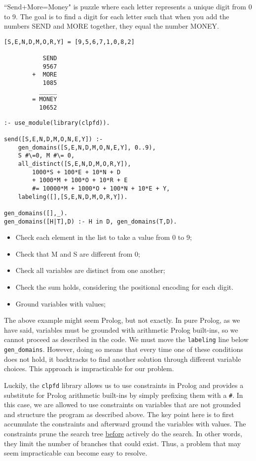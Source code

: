 \documentclass{article}
\begin{document}
\begin{example}
    ``Send+More=Money" is puzzle where each letter represents a unique digit
    from 0 to 9. The goal is to find a digit for each letter such that when
    you add the numbers SEND and MORE together, they equal the number MONEY.
{\small
    \begin{verbatim}
[S,E,N,D,M,O,R,Y] = [9,5,6,7,1,0,8,2]

           SEND
           9567
        +  MORE
           1085 
          _____
        = MONEY
          10652
    \end{verbatim}
    \begin{verbatim}
:- use_module(library(clpfd)).

send([S,E,N,D,M,O,N,E,Y]) :-
    gen_domains([S,E,N,D,M,O,N,E,Y], 0..9),
    S #\=0, M #\= 0,
    all_distinct([S,E,N,D,M,O,R,Y]),
        1000*S + 100*E + 10*N + D 
        + 1000*M + 100*O + 10*R + E
        #= 10000*M + 1000*O + 100*N + 10*E + Y,
    labeling([],[S,E,N,D,M,O,R,Y]).

gen_domains([],_).
gen_domains([H|T],D) :- H in D, gen_domains(T,D).
    \end{verbatim}
}
    \begin{itemize}
        \item Check each element in the list to take
            a value from 0 to 9;
        \item Check that M and S are different from 0;
        \item Check all variables are distinct from one another;
        \item Check the sum holds, considering the positional encoding
            for each digit.
        \item Ground variables with values;
    \end{itemize}
\end{example}
The above example might seem Prolog, but not exactly. In pure Prolog, as we
have said, variables must be grounded with arithmetic Prolog built-ins, so we
cannot proceed as described in the code. We must move the \texttt{labeling}
line below \texttt{gen\_domains}. However, doing so means that every time one
of these conditions does not hold, it backtracks to find another solution
through different variable choices. This approach is impracticable for our
problem.

Luckily, the \texttt{clpfd} library allows us to use constraints in Prolog and
provides a substitute for Prolog arithmetic built-ins by simply prefixing them
with a \texttt{\#}. In this case, we are allowed to use constraints on
variables that are not grounded and structure the program as described above.
The key point here is to first accumulate the constraints and afterward ground
the variables with values. The constraints prune the search tree
\underline{before} actively do the search. In other words, they limit the
number of branches that could exist. Thus, a problem that may seem
impracticable can become easy to resolve.
\end{document}
